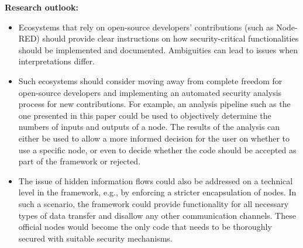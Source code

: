 \textbf{Research outlook:}
\begin{itemize}[label=\textbullet]
    \item Ecosystems that rely on open-source developers' contributions (such as Node-RED) should provide clear instructions on how security-critical functionalities should be implemented and documented.
    Ambiguities can lead to issues when interpretations differ.
    \item Such ecosystems should consider moving away from complete freedom for open-source developers and implementing an automated security analysis process for new contributions.
    For example, an analysis pipeline such as the one presented in this paper could be used to objectively determine the numbers of inputs and outputs of a node.
    The results of the analysis can either be used to allow a more informed decision for the user on whether to use a specific node, or even to decide whether the code should be accepted as part of the framework or rejected.
    \item The issue of hidden information flows could also be addressed on a technical level in the framework, e.g., by enforcing a stricter encapsulation of nodes.
    In such a scenario, the framework could provide functionality for all necessary types of data transfer and disallow any other communication channels.
    These official nodes would become the only code that needs to be thoroughly secured with suitable security mechanisms.
\end{itemize}